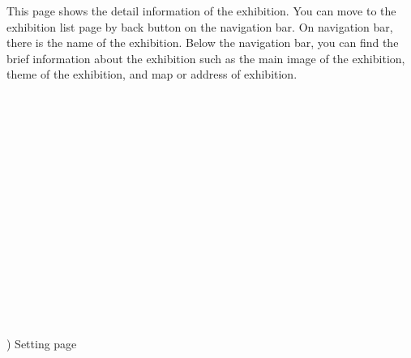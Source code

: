 \documentclass[conference]{IEEEtran}
\begin{document}
This page shows the detail information of the exhibition. You can move to the exhibition list page by back button on the navigation bar. On navigation bar, there is the name of the exhibition. Below the navigation bar, you can find the brief information about the exhibition such as the main image of the exhibition, theme of the exhibition, and map or address of exhibition. \\\\\\\\\\\\\\\\\\\\\\\\\\\\\\\\\\



) Setting page
\end{document}
